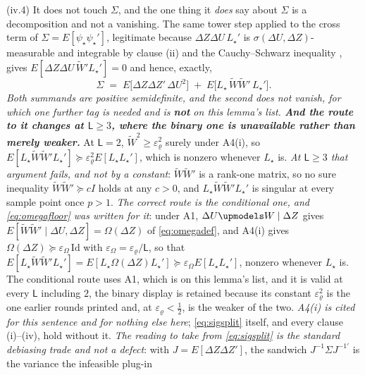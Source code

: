 \begin{lemma}[{The moment is valid, its variance is finite, its $\theta$-Jacobian is $-J$, and $J=E[\Delta Z\Delta Z']$}]
\textup{(iv.4)} It does not touch $\Sigma$, and the one thing it \emph{does} say about $\Sigma$ is a
decomposition and not a vanishing. The same tower step applied to the cross term of
$\Sigma=E[\psi_\star\psi_\star']$, legitimate because $\Delta Z\Delta U\,L_\star'$ is
$\sigma(\Delta U,\Delta Z)$-measurable and integrable by clause (ii) and the Cauchy--Schwarz inequality
, gives $E[\Delta Z\Delta U\,\widetilde W'L_\star']=0$ and hence, exactly,
\begin{equation}\label{eq:sigsplit}
\Sigma\;=\;E\big[\Delta Z\Delta Z'\,\Delta U^{2}\big]\;+\;E\big[L_\star\,\widetilde W\widetilde W'\,L_\star'\big] .
\end{equation}
\emph{Both summands are positive semidefinite, and the second does not vanish, for which one further
tag is needed and is \textbf{not} on this lemma's list. \textbf{And the route to it changes at
$\mathsf L\ge3$, where the binary one is unavailable rather than merely weaker.}} At $\mathsf L=2$,
$\widetilde W^{2}\ge\varepsilon_\varrho^{2}$ surely under A4(i), so
$E[L_\star\widetilde W\widetilde W'L_\star']\succeq\varepsilon_\varrho^{2}E[L_\star L_\star']$, which is
nonzero whenever $L_\star$ is. \emph{At $\mathsf L\ge3$ that argument fails, and not by a constant}:
$\widetilde W\widetilde W'$ is a rank-one matrix, so no sure inequality
$\widetilde W\widetilde W'\succeq cI$ holds at any $c>0$, and $L_\star\widetilde W\widetilde W'L_\star'$
is singular at every sample point once $p>1$. \emph{The correct route is the conditional one, and
\eqref{eq:omegafloor} was written for it}: under A1, $\Delta U\upmodels W\mid\Delta Z$ gives
$E[\widetilde W\widetilde W'\mid\Delta U,\Delta Z]=\Omega(\Delta Z)$ of \eqref{eq:omegadef}, and A4(i)
gives $\Omega(\Delta Z)\succeq\varepsilon_\Omega\,\mathrm{Id}$ with $\varepsilon_\Omega=\varepsilon_\varrho/\mathsf L$,
so that
$E[L_\star\widetilde W\widetilde W'L_\star']=E[L_\star\Omega(\Delta Z)L_\star']\succeq\varepsilon_\Omega
E[L_\star L_\star']$, nonzero whenever $L_\star$ is. The conditional route uses A1, which is on this
lemma's list, and it is valid at every $\mathsf L$ including $2$, the binary display is retained
because its constant $\varepsilon_\varrho^{2}$ is the one earlier rounds printed and, at
$\varepsilon_\varrho<\tfrac12$, is the weaker of the two. \emph{A4(i) is cited
for this sentence and for nothing else here}; \eqref{eq:sigsplit} itself, and every clause
\textup{(i)}--\textup{(iv)}, hold without it. \emph{The reading to
take from \eqref{eq:sigsplit} is the standard debiasing trade and not a defect}: with
$J=E[\Delta Z\Delta Z']$, the sandwich $J^{-1}\Sigma J^{-1\prime}$ is the variance the infeasible plug-in

\end{lemma}
